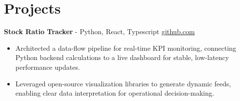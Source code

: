 \documentclass[11pt]{article}       %
\begin{document}
\vspace{-18.5pt}

\section*{Projects}

\textbf{Stock Ratio Tracker}{ - Python, React, Typescript} \hfill \href{https://github.com/Monica20030707/tradingDashboard-UI}{github.com} \\
\vspace{-9pt}
\begin{itemize}
  \item Architected a data-flow pipeline for real-time KPI monitoring, connecting Python backend calculations to a live dashboard for stable, low-latency performance updates. 
  \item Leveraged open-source visualization libraries to generate dynamic feeds, enabling clear data interpretation for operational decision-making.
\end{itemize}

\end{document}
